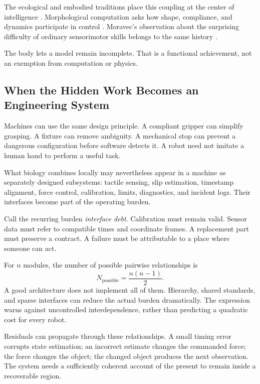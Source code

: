 \documentclass[11pt,openany]{book}
\begin{document}
The ecological and embodied traditions place this coupling at the center of intelligence \cite{gibson1979,varela1991,gibsonpick2000}. Morphological computation asks how shape, compliance, and dynamics participate in control \cite{pfeifer2007,pfeiferbongard2006,hauser2011}. Moravec's observation about the surprising difficulty of ordinary sensorimotor skills belongs to the same history \cite{moravec1988}.

The body lets a model remain incomplete. That is a functional achievement, not an exemption from computation or physics.

\subsection{When the Hidden Work Becomes an Engineering System}

Machines can use the same design principle. A compliant gripper can simplify grasping. A fixture can remove ambiguity. A mechanical stop can prevent a dangerous configuration before software detects it. A robot need not imitate a human hand to perform a useful task.

What biology combines locally may nevertheless appear in a machine as separately designed subsystems: tactile sensing, slip estimation, timestamp alignment, force control, calibration, limits, diagnostics, and incident logs. Their interfaces become part of the operating burden.

Call the recurring burden \emph{interface debt}. Calibration must remain valid. Sensor data must refer to compatible times and coordinate frames. A replacement part must preserve a contract. A failure must be attributable to a place where someone can act.

For $n$ modules, the number of possible pairwise relationships is
\begin{equation}
 N_{\mathrm{possible}}=\frac{n(n-1)}{2}.
\end{equation}
A good architecture does not implement all of them. Hierarchy, shared standards, and sparse interfaces can reduce the actual burden dramatically. The expression warns against uncontrolled interdependence, rather than predicting a quadratic cost for every robot.

Residuals can propagate through these relationships. A small timing error corrupts state estimation; an incorrect estimate changes the commanded force; the force changes the object; the changed object produces the next observation. The system needs a sufficiently coherent account of the present to remain inside a recoverable region.
\end{document}
